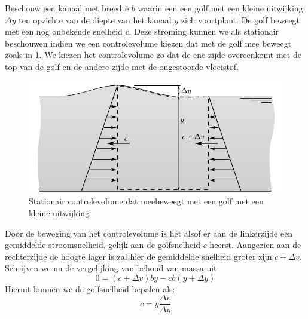 Beschouw een kanaal met breedte $b$  waarin een een golf met een kleine uitwijking $\Delta y$ ten opzichte van de diepte van het kanaal $y$ zich voortplant. De golf beweegt met een nog onbekende snelheid $c$. Deze stroming kunnen we als stationair beschouwen indien we een controlevolume kiezen dat met de golf mee beweegt zoals in \ref{fig:Golfsnelheid}. We kiezen het controlevolume zo dat de ene zijde overeenkomt met de top van de golf en de andere zijde met de ongestoorde vloeistof.
\begin{figure}[htb]
	\centering
	\includegraphics{fig/kanaalstroming/Golfsnelheid}
	\caption{Stationair controlevolume dat meebeweegt met een golf met een kleine uitwijking}
	\label{fig:Golfsnelheid}
\end{figure}
Door de beweging van het controlevolume is het alsof er aan de linkerzijde een gemiddelde stroomsnelheid, gelijk aan de golfsnelheid $c$ heerst. Aangezien aan de rechterzijde de hoogte lager is zal hier de gemiddelde snelheid groter zijn $c+\Delta v$. Schrijven we nu de vergelijking van behoud van massa uit:
\begin{equation}
	0 = (c+\Delta v) b y - c b (y+\Delta y)
\end{equation}
Hieruit kunnen we de golfsnelheid bepalen als:
\begin{equation}
	c = y \frac{\Delta v}{\Delta y}
	\label{eqn:golfsnelheid behoud van massa}
\end{equation}

